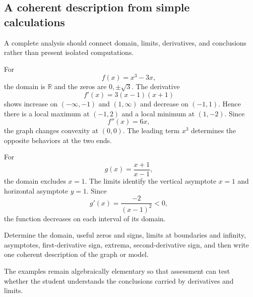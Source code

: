 \subsection{A coherent description from simple calculations}

A complete analysis should connect domain, limits, derivatives, and conclusions rather than present isolated computations.

\begin{examplebox}
For
\[
f(x)=x^3-3x,
\]
the domain is $\mathbb R$ and the zeros are $0,\pm\sqrt3$. The derivative
\[
f'(x)=3(x-1)(x+1)
\]
shows increase on $(-\infty,-1)$ and $(1,\infty)$ and decrease on $(-1,1)$. Hence there is a local maximum at $(-1,2)$ and a local minimum at $(1,-2)$. Since
\[
f''(x)=6x,
\]
the graph changes convexity at $(0,0)$. The leading term $x^3$ determines the opposite behaviors at the two ends.
\end{examplebox}

\begin{examplebox}
For
\[
g(x)=\frac{x+1}{x-1},
\]
the domain excludes $x=1$. The limits identify the vertical asymptote $x=1$ and horizontal asymptote $y=1$. Since
\[
g'(x)=\frac{-2}{(x-1)^2}<0,
\]
the function decreases on each interval of its domain.
\end{examplebox}

\begin{summarybox}
Determine the domain, useful zeros and signs, limits at boundaries and infinity, asymptotes, first-derivative sign, extrema, second-derivative sign, and then write one coherent description of the graph or model.
\end{summarybox}

The examples remain algebraically elementary so that assessment can test whether the student understands the conclusions carried by derivatives and limits.

